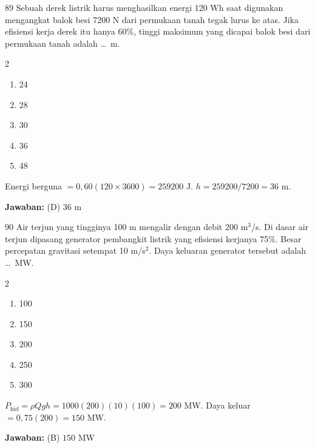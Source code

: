 \documentclass[11pt]{article}
\newenvironment{pilB}{%
  \par\smallskip\begin{multicols}{2}
  \begin{enumerate}[label=(\Alph*),leftmargin=*,itemsep=1pt,topsep=3pt]}%
  {\end{enumerate}\end{multicols}}
\newcommand{\jawaban}[1]{%
  \noindent\colorbox{gold!30}{\parbox{\dimexpr\linewidth-2\fboxsep\relax}{%
    \textbf{Jawaban:} #1}}\par\smallskip}
\begin{document}
\begin{soal}{89}
Sebuah derek listrik harus menghasilkan energi 120 Wh saat digunakan
mengangkat balok besi 7200 N dari permukaan tanah tegak lurus ke atas.
Jika efisiensi kerja derek itu hanya 60\%, tinggi maksimum yang dicapai
balok besi dari permukaan tanah adalah \ldots\ m.
\begin{pilB}
  \item 24 \item 28 \item 30 \item 36 \item 48
\end{pilB}
\end{soal}

\begin{pembox}
Energi berguna $=0{,}60(120\times3600)=259200$ J. $h=259200/7200=36$ m.
\jawaban{(D) $36$ m}
\end{pembox}

\begin{soal}{90}
Air terjun yang tingginya 100 m mengalir dengan debit 200 m$^3$/s. Di
dasar air terjun dipasang generator pembangkit listrik yang efisiensi
kerjanya 75\%. Besar percepatan gravitasi setempat 10 m/s$^2$. Daya
keluaran generator tersebut adalah \ldots\ MW.
\begin{pilB}
  \item 100 \item 150 \item 200 \item 250 \item 300
\end{pilB}
\end{soal}

\begin{pembox}
$P_{\text{hid}}=\rho Qgh=1000(200)(10)(100)=200$ MW. Daya keluar $=0{,}75(200)=150$ MW.
\jawaban{(B) $150$ MW}
\end{pembox}
\end{document}
